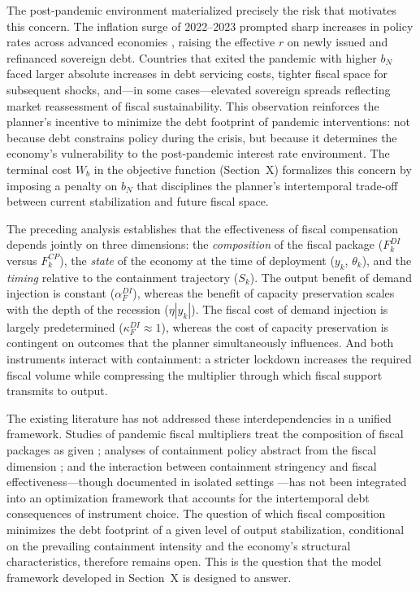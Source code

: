 The post-pandemic environment materialized precisely the risk that motivates this concern. The inflation surge of 2022--2023 prompted sharp increases in policy rates
across advanced economies \citep{jorda2023}, raising the effective $r$ on newly issued and refinanced sovereign debt. Countries that exited the pandemic with higher $b_N$
faced larger absolute increases in debt servicing costs, tighter fiscal space for subsequent shocks, and---in some cases---elevated sovereign spreads reflecting market
reassessment of fiscal sustainability. This observation reinforces the planner's incentive to minimize the debt footprint of pandemic interventions: not because debt
constrains policy during the crisis, but because it determines the economy's vulnerability to the post-pandemic interest rate environment. The terminal cost $W_b$ in the objective function (Section~X) formalizes this concern by imposing a penalty on $b_N$ that disciplines the planner's intertemporal trade-off between current
stabilization and future fiscal space. 





The preceding analysis establishes that the effectiveness of fiscal compensation
depends jointly on three dimensions: the \textit{composition} of the fiscal package
($F_k^{DI}$ versus $F_k^{CP}$), the \textit{state} of the economy at the time of
deployment ($y_k$, $\theta_k$), and the \textit{timing} relative to the containment
trajectory ($S_k$). The output benefit of demand injection is constant
($\alpha_F^{DI}$), whereas the benefit of capacity preservation scales with the depth
of the recession ($\eta |y_k|$). The fiscal cost of demand injection is largely
predetermined ($\kappa_F^{DI} \approx 1$), whereas the cost of capacity preservation
is contingent on outcomes that the planner simultaneously influences. And both
instruments interact with containment: a stricter lockdown increases the required
fiscal volume while compressing the multiplier through which fiscal support transmits
to output.

The existing literature has not addressed these interdependencies in a unified
framework. Studies of pandemic fiscal multipliers treat the composition of fiscal
packages as given \citep{auerbach2022,bayer2023}; analyses of containment policy
abstract from the fiscal dimension \citep{acemoglu2021,alvarez2021}; and the
interaction between containment stringency and fiscal effectiveness---though documented
in isolated settings \citep{XXauerbach_defense_spendingXX}---has not been integrated
into an optimization framework that accounts for the intertemporal debt consequences
of instrument choice. The question of which fiscal composition minimizes the debt
footprint of a given level of output stabilization, conditional on the prevailing
containment intensity and the economy's structural characteristics, therefore remains
open. This is the question that the model framework developed in Section~X is
designed to answer.

